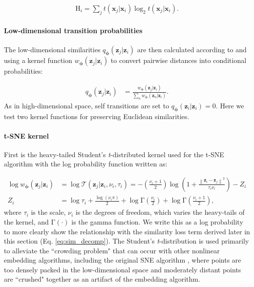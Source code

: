 \documentclass[11pt,a4paper,oneside]{book}
\begin{document}
\begin{appendices}
\begin{align}
\mathrm{H}_i = \sum_{j} t(\mathbf{x}_j | \mathbf{x}_i) \log_2 t(\mathbf{x}_j | \mathbf{x}_i).
\end{align}
\paragraph{Low-dimensional transition probabilities} The low-dimensional similarities $q_{\boldsymbol{\phi}}(\mathbf{z}_j | \mathbf{z}_i)$ are then calculated according to \cite{hinton2003stochastic} and \cite{maaten2008tsne} using a kernel function $w_{\boldsymbol{\phi}}(\mathbf{z}_j | \mathbf{z}_i)$ to convert pairwise distances into conditional probabilities:

\begin{align}
    q_{\boldsymbol{\phi}}(\mathbf{z}_j | \mathbf{z}_i) &=  \frac{w_{\boldsymbol{\phi}}(\mathbf{z}_j | \mathbf{z}_i)}{\sum_{n} w_{\boldsymbol{\phi}}(\mathbf{z}_n | \mathbf{z}_i)}\label{eq:lowd_sim}.
\end{align}
As in high-dimensional space, self transitions are set to $q_{\boldsymbol{\phi}}(\mathbf{z}_i|\mathbf{z}_i) = 0$. Here we test two kernel functions for preserving Euclidean similarities. 
\paragraph{t-SNE kernel} First is the heavy-tailed Student's \textit{t}-distributed kernel used for the t-SNE algorithm \citep{maaten2008tsne} with the log probability function written as:

\begin{subequations}
    \begin{align}
    \log w_{\boldsymbol{\phi}}(\mathbf{z}_j | \mathbf{z}_i) &= \log \mathcal{T}(\mathbf{z
    }_j | \mathbf{z}_i, \nu_i, \tau_i) = -\left(\frac{\nu_i + 1}{2}\right)\log \left(1+\frac{\left\|\mathbf{z}_{i} - \mathbf{z}_{j} \right\|^{2}}{\tau_i \nu_i}\right) - Z_i \label{eq:tsne_logp}\\
    Z_i &= \log\tau_i + \frac{\log(\nu_i\pi)}{2} + \log \mathrm{\Gamma}\left(\frac{\nu_i}{2}\right) + \log \mathrm{\Gamma}\left(\frac{\nu_i + 1}{2}\right)\label{eq:tsne_z},
\end{align}
\end{subequations}
where $\tau_i$ is the scale, $\nu_i$ is the degrees of freedom, which varies the heavy-tails of the kernel, and $\mathrm{\Gamma}(\cdot)$ is the gamma function. We write this as a log probability to more clearly show the relationship with the similarity loss term derived later in this section (Eq. \ref{eq:sim_decomp}). The Student's \textit{t}-distribution is used primarily to alleviate the ``crowding problem" \citep{maaten2008tsne} that can occur with other nonlinear embedding algorithms, including the original SNE algorithm \citep{hinton2003stochastic}, where points are too densely packed in the low-dimensional space and moderately distant points are ``crushed" together as an artifact of the embedding algorithm. 


\end{appendices}
\end{document}
